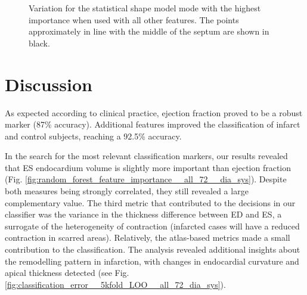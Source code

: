 \documentclass[journal]{IEEEtran}
\begin{document}
	\begin{figure}[]		
\begin{center}   
\qquad
{}


\caption{ Variation for the statistical shape model mode with the highest importance when used with all other features. The points approximately in line with the middle of the septum are shown in black. }
\label{fig:visualise_shapes}
\end{center}
		\end{figure}

\section{Discussion}

As expected according to clinical practice, ejection fraction proved to be a robust marker (87\% accuracy). Additional features improved the classification of infarct and control subjects, reaching a 92.5\% accuracy. 

In the search for the most relevant classification markers, our results revealed that ES endocardium volume is slightly more important than ejection fraction (Fig. \ref{fig:random_forest_feature_importance__all_72__dia_sys}). Despite both measures being strongly correlated, they still revealed a large complementary value. The third metric that contributed to the decisions in our classifier was the variance in the thickness difference between ED and ES, a surrogate of the heterogeneity of contraction (infarcted cases will have a reduced contraction in scarred areas). Relatively, the atlas-based metrics made a small contribution to the classification. The analysis revealed additional insights about the remodelling pattern in infarction, with changes in endocardial curvature and apical thickness detected (see Fig. \ref{fig:classification_error__5kfold_LOO__all_72_dia_sys}).
\end{document}
